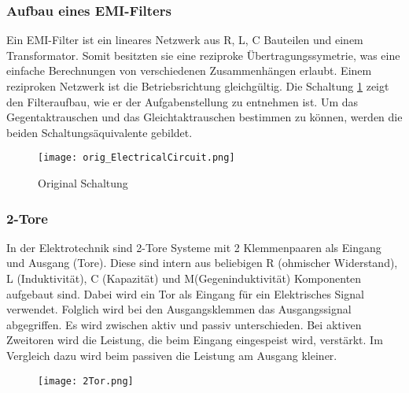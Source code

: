 \subsubsection{Aufbau eines EMI-Filters} \label{subsubsec:emi_filter}
Ein EMI-Filter ist ein lineares Netzwerk aus R, L, C Bauteilen und einem Transformator. Somit besitzten sie eine reziproke Übertragungssymetrie, was eine einfache Berechnungen von verschiedenen Zusammenhängen erlaubt. Einem reziproken Netzwerk ist die Betriebsrichtung gleichgültig.
Die Schaltung \ref{fig:orig_Schaltung}  zeigt den Filteraufbau, wie er der Aufgabenstellung zu entnehmen ist. Um das Gegentaktrauschen und das Gleichtaktrauschen bestimmen zu können, werden die beiden Schaltungsäquivalente gebildet. 

\begin{figure}[H]
	\centering
	\texttt{[image: orig\_ElectricalCircuit.png]}
	\caption{Original Schaltung \cite{aufgabenstellung}}
	\label{fig:orig_Schaltung}
\end{figure}


\subsubsection{2-Tore} \label{subsubsec:emi_filter}

In der Elektrotechnik sind 2-Tore Systeme mit 2 Klemmenpaaren als Eingang und Ausgang (Tore). Diese sind intern aus beliebigen
R (ohmischer Widerstand), L (Induktivität), C (Kapazität) und M(Gegeninduktivität) Komponenten aufgebaut sind. 
Dabei wird ein Tor als Eingang für ein Elektrisches Signal verwendet. Folglich wird bei den Ausgangsklemmen das Ausgangssignal abgegriffen. 
Es wird zwischen aktiv und passiv unterschieden.
Bei aktiven Zweitoren wird die Leistung, die beim Eingang eingespeist wird, verstärkt. 
Im Vergleich dazu wird beim passiven die Leistung am Ausgang kleiner.

\begin{figure}[H]
	\centering
	\texttt{[image: 2Tor.png]}
	\label{fig:übersicht}
\end{figure}